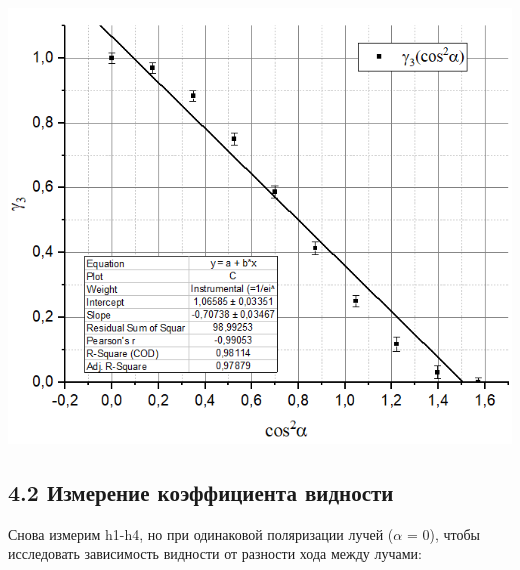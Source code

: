 \documentclass[a4paper,12pt]{report}
\begin{document}
\begin{center}
    \includegraphics[width =0.8 \linewidth]{gamma3(cos^2(alpha)).png}
\end{center}

\subsection*{4.2 Измерение коэффициента видности}

Снова измерим h1-h4, но при одинаковой поляризации лучей ($\alpha$ = 0), чтобы исследовать зависимость видности от разности хода между лучами:
\end{document}
